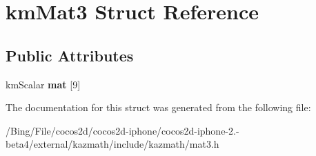 \hypertarget{structkm_mat3}{\section{km\-Mat3 Struct Reference}
\label{structkm_mat3}
}
\subsection*{Public Attributes}
\begin{DoxyCompactItemize}
\item 
\hypertarget{structkm_mat3_ae62896cf1c8f7a94e7a18dede8480125}{km\-Scalar {\bfseries mat} \mbox{[}9\mbox{]}}\label{structkm_mat3_ae62896cf1c8f7a94e7a18dede8480125}

\end{DoxyCompactItemize}


The documentation for this struct was generated from the following file\-:\begin{DoxyCompactItemize}
\item 
/\-Bing/\-File/cocos2d/cocos2d-\/iphone/cocos2d-\/iphone-\/2.-\/beta4/external/kazmath/include/kazmath/mat3.\-h\end{DoxyCompactItemize}
